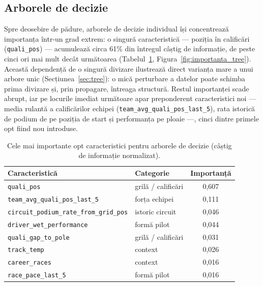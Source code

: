 \documentclass[12pt,a4paper]{report}
\begin{document}
\subsection{Arborele de decizie}

Spre deosebire de pădure, arborele de decizie individual își concentrează importanța într-un grad
extrem: o singură caracteristică --- poziția în calificări (\texttt{quali\_pos}) --- acumulează circa
61\% din întregul câștig de informație, de peste cinci ori mai mult decât următoarea
(Tabelul~\ref{tab:importanta_tree}, Figura~\ref{fig:importanta_tree}). Această dependență de o
singură divizare ilustrează direct varianța mare a unui arbore unic (Secțiunea~\ref{sec:tree}): o
mică perturbare a datelor poate schimba prima divizare și, prin propagare, întreaga structură. Restul
importanței scade abrupt, iar pe locurile imediat următoare apar preponderent caracteristici noi ---
media rulantă a calificărilor echipei (\texttt{team\_avg\_quali\_pos\_last\_5}), rata istorică de
podium de pe poziția de start și performanța pe ploaie ---, cinci dintre primele opt fiind nou
introduse.

\begin{table}[htbp]
  \centering
  \begin{tabular}{l l c}
    \toprule
    \textbf{Caracteristică} & \textbf{Categorie} & \textbf{Importanță} \\
    \midrule
    \texttt{quali\_pos}                             & grilă / calificări & 0,607 \\
    \texttt{team\_avg\_quali\_pos\_last\_5}         & forța echipei      & 0,111 \\
    \texttt{circuit\_podium\_rate\_from\_grid\_pos} & istoric circuit    & 0,046 \\
    \texttt{driver\_wet\_performance}               & formă pilot        & 0,044 \\
    \texttt{quali\_gap\_to\_pole}                   & grilă / calificări & 0,031 \\
    \texttt{track\_temp}                            & context            & 0,026 \\
    \texttt{career\_races}                          & context            & 0,016 \\
    \texttt{race\_pace\_last\_5}                    & formă pilot        & 0,016 \\
    \bottomrule
  \end{tabular}
  \caption{Cele mai importante opt caracteristici pentru arborele de decizie (câștig de informație normalizat).}
  \label{tab:importanta_tree}
\end{table}
\end{document}
